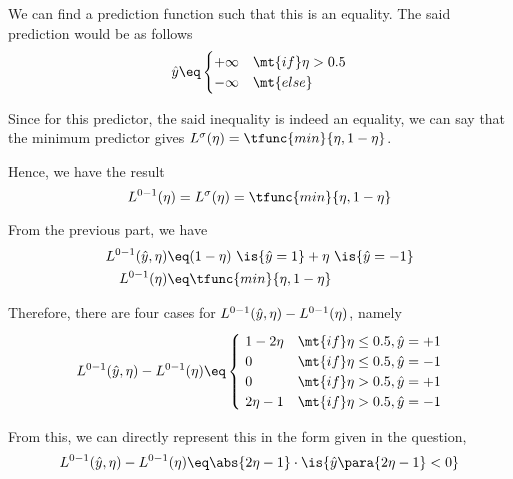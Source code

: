 \documentclass[a4paper,10pt]{article}
\begin{document}
\begin{question}
\begin{qpart}{1}
		We can find a prediction function such that this is an equality. The said prediction would be as follows
		\begin{align*}
			\wy	\eq	\begin{cases}
				+ \infty	& \mt{if} \eta > 0.5 \\
				- \infty	& \mt{else}
			\end{cases}
		\end{align*}

		Since for this predictor, the said inequality is indeed an equality, we can say that the minimum predictor gives $L^{\sigma}(\eta) = \tfunc{min}{\eta, 1 - \eta}$.

		Hence, we have the result
		\begin{equation}
			L^{0-1}(\eta) = L^{\sigma}(\eta) = \tfunc{min}{\eta, 1 - \eta}
			\label{eq:q1-p1}
		\end{equation}

	\end{qpart}

	\begin{qpart}{2}

		From the previous part, we have
		\begin{align*}
			L^{0-1}(\wy, \eta)	&\eq	(1 - \eta)\ \is{\wy = 1} + \eta\ \is{\wy = -1} \\
			L^{0-1}(\eta)		&\eq	\tfunc{min}{\eta, 1 - \eta}
		\end{align*}

		Therefore, there are four cases for $L^{0-1}(\hat{y}, \eta) - L^{0-1}(\eta)$, namely
		\begin{align*}
			L^{0-1}(\wy, \eta) - L^{0-1}(\eta)	\eq	\begin{cases}
				\ 1 - 2 \eta	& \mt{if} \eta \le 0.5, \wy = +1 \\
				\ 0				& \mt{if} \eta \le 0.5, \wy = -1 \\
				\ 0				& \mt{if} \eta  >  0.5, \wy = +1 \\
				\ 2 \eta - 1	& \mt{if} \eta  >  0.5, \wy = -1 \\
			\end{cases}
		\end{align*}

		From this, we can directly represent this in the form given in the question, \ie
		\begin{align*}
			L^{0-1}(\wy, \eta) - L^{0-1}(\eta)	\eq	\abs{2 \eta - 1} \cdot \is{\wy \para{2 \eta - 1} < 0}
		\end{align*}

	\end{qpart}


\end{question}
\end{document}
